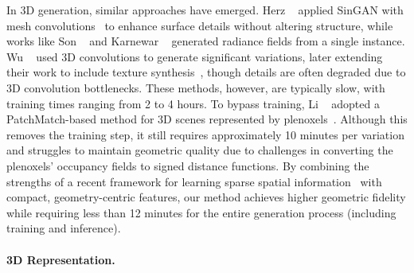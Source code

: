 In 3D generation, similar approaches have emerged. Herz \etal~\cite{10.1145/3386569.3392471} applied SinGAN with mesh convolutions~\cite{hanocka2019meshcnn} to enhance surface details without altering structure, while works like Son \etal~\cite{son2023singraf} and Karnewar \etal~\cite{karnewar20223ingan} generated radiance fields from a single instance. Wu \etal~\cite{wu2022learning} used 3D convolutions to generate significant variations, later extending their work to include texture synthesis~\cite{wu2024sindm}, though details are often degraded due to 3D convolution bottlenecks. These methods, however, are typically slow, with training times ranging from 2 to 4 hours.
To bypass training, Li \etal~\cite{li2023patch} adopted a PatchMatch-based method for 3D scenes represented by plenoxels~\cite{fridovich2022plenoxels}. Although this removes the training step, it still requires approximately 10 minutes per variation and struggles to maintain geometric quality due to challenges in converting the plenoxels’ occupancy fields to signed distance functions.
By combining the strengths of a recent framework for learning sparse spatial information~\cite{williams2024fvdb} with compact, geometry-centric features, 
our method achieves higher geometric fidelity while requiring less than 12 minutes for the entire generation process (including training and inference). 


\vspace*{-4mm}
\paragraph{3D Representation.}

